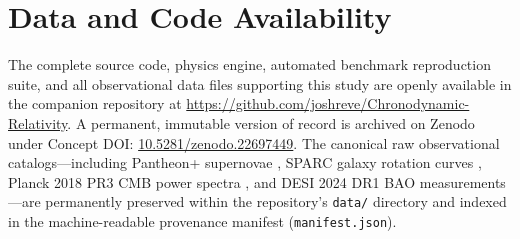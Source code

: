 \documentclass[aps,prd,reprint,superscriptaddress,nofootinbib,floatfix,amsmath,amssymb]{revtex4-2}
\begin{document}
\section*{Data and Code Availability}
The complete source code, physics engine, automated benchmark reproduction suite, and all observational data files supporting this study are openly available in the companion repository \cite{shreve_chronodynamic_2026} at \url{https://github.com/joshreve/Chronodynamic-Relativity}. A permanent, immutable version of record is archived on Zenodo under Concept DOI: \href{https://doi.org/10.5281/zenodo.22697449}{10.5281/zenodo.22697449}. The canonical raw observational catalogs—including Pantheon+ supernovae \cite{PantheonPlus2022}, SPARC galaxy rotation curves \cite{SPARC2016}, Planck 2018 PR3 CMB power spectra \cite{Planck2018_Cosmology}, and DESI 2024 DR1 BAO measurements \cite{DESI2024_BAO}—are permanently preserved within the repository's \texttt{data/} directory and indexed in the machine-readable provenance manifest (\texttt{manifest.json}).


\end{document}
